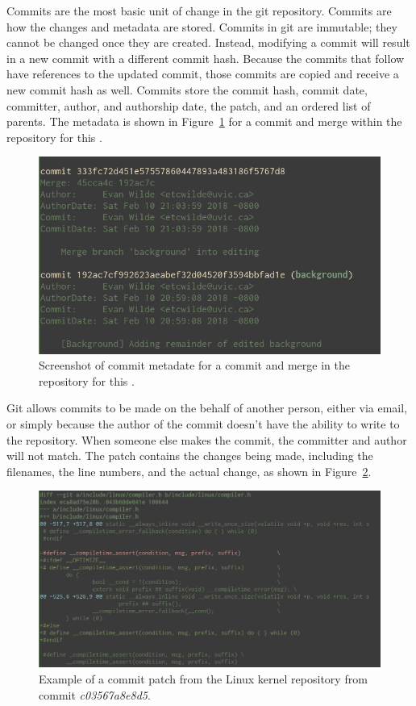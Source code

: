 Commits are the most basic unit of change in the git repository.
Commits are how the changes and metadata are stored.
Commits in git are immutable; they cannot be changed once they are
created. Instead, modifying a commit will result
in a new commit with a different commit hash.
Because the commits that follow have references to the updated commit,
those commits are copied and receive a new commit hash as well.
Commits store the commit hash, commit date,
committer, author, and authorship date, the patch, and an ordered list
of parents. The metadata is shown in Figure~\ref{fig:commit_metadata}
for a commit and merge within the repository for this \paper{}.

\begin{figure}[htpb]
  \centering
  \includegraphics[width=0.8\linewidth]{Figures/background/commit_metadata.png}
  \caption{Screenshot of commit metadate for a commit and merge in the
    repository for this \paper{}.}
  \label{fig:commit_metadata}
\end{figure}

Git allows commits to be made on the behalf of another person, either
via email, or simply because the author of the commit doesn't have the
ability to write to the repository.
When someone else makes the commit, the committer and author will not
match. The patch contains the changes being made, including the
filenames, the line numbers, and the actual change, as shown in
Figure~\ref{fig:commit_patch}.

\begin{figure}[htpb]
  \centering
  \includegraphics[width=0.8\linewidth]{Figures/background/commit_patch.png}
  \caption{Example of a commit patch from the Linux kernel repository
    from commit \textit{c03567a8e8d5}.}
  \label{fig:commit_patch}
\end{figure}

